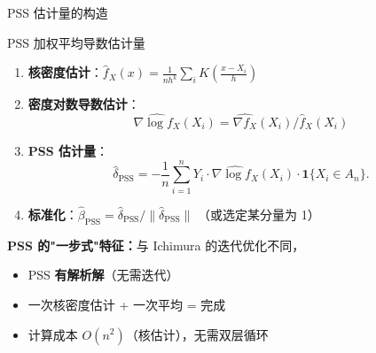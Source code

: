 \documentclass[aspectratio=169, 10pt]{beamer}
\begin{document}
\begin{frame}{PSS 估计量的构造}

  \begin{definitionbox}{{PSS 加权平均导数估计量}}
    \begin{enumerate}\setlength{\itemsep}{1pt}
      \item \textbf{核密度估计}：$\hat f_X(x) = \frac{1}{n h^k} \sum_i K\!\left(\frac{x - X_i}{h}\right)$
      \item \textbf{密度对数导数估计}：
      $$\widehat{\nabla \log f_X}(X_i) = \widehat{\nabla f_X}(X_i) / \hat f_X(X_i)$$
      \item \textbf{PSS 估计量}：
      $$\hat\delta_{\text{PSS}} = -\frac{1}{n}\sum_{i=1}^n Y_i \cdot
      \widehat{\nabla \log f_X}(X_i) \cdot \mathbf{1}\{X_i \in A_n\}.$$
      \item \textbf{标准化}：$\hat\beta_{\text{PSS}} = \hat\delta_{\text{PSS}} / \|\hat\delta_{\text{PSS}}\|$
      （或选定某分量为 1）
    \end{enumerate}
  \end{definitionbox}

  \begin{highlightbox}
    \textbf{PSS 的"一步式"特征：}与 Ichimura 的迭代优化不同，
    \begin{itemize}\setlength{\itemsep}{1pt}
      \item PSS \textbf{有解析解}（无需迭代）
      \item 一次核密度估计 + 一次平均 = 完成
      \item 计算成本 $O(n^2)$（核估计），无需双层循环
    \end{itemize}
  \end{highlightbox}

\end{frame}
\end{document}
